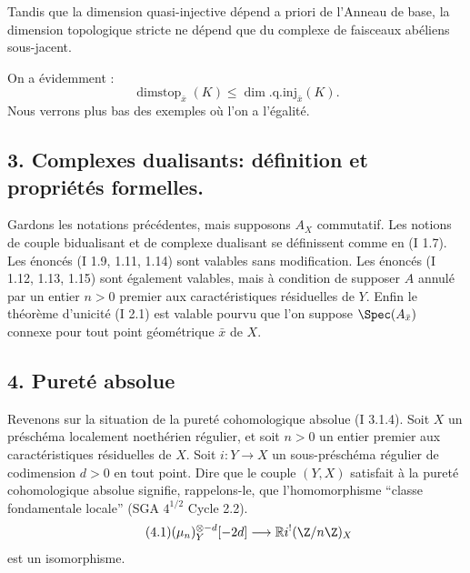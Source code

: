Tandis que la dimension quasi-injective dépend a priori de l'Anneau 
de base, la
dimension topologique stricte ne dépend que du complexe de faisceaux abéliens sous-jacent.

On a évidemment :
\[
        \operatorname{dimstop}_{\bar{x}}(K)\leq \dim.\mathrm{q.inj}_{\bar{x}}(K).
\]
Nous verrons plus bas des exemples où l'on a l'égalité.

\subsection*{3. Complexes dualisants: définition et propriétés formelles.}

Gardons les notations précédentes, mais supposons $A_X$ commutatif. Les notions de couple bidualisant et de complexe dualisant se définissent comme en (I 1.7). Les énoncés (I 1.9, 1.11, 1.14) sont valables sans modification. Les énoncés (I 1.12, 1.13, 1.15) sont également valables, mais à condition de supposer $A$ annulé par un entier $n>0$ premier aux caractéristiques résiduelles de $Y$. Enfin le théorème d'unicité (I 2.1) est valable pourvu que l'on suppose $\Spec(A_{\bar{x}})$ connexe pour tout point géométrique $\bar{x}$ de $X$.

\subsection*{4. Pureté absolue}

Revenons sur la situation de la pureté cohomologique absolue (I 3.1.4). Soit $X$ un préschéma localement noethérien régulier, et soit $n>0$ un entier premier aux caractéristiques résiduelles de $X$. Soit $i:Y\to X$ un sous-préschéma régulier de codimension $d>0$ en tout point. Dire que le couple $(Y,X)$ satisfait à la pureté cohomologique absolue signifie, rappelons-le, que l'homomorphisme ``classe fondamentale locale'' (SGA $4^{1/2}$ Cycle 2.2).
\begin{equation}\tag{4.1}
        (\mu_n)_Y^{\otimes -d}[-2d]\longrightarrow \mathbb{R} i^!(\Z/n\Z)_X
\end{equation}
est un
isomorphisme.

